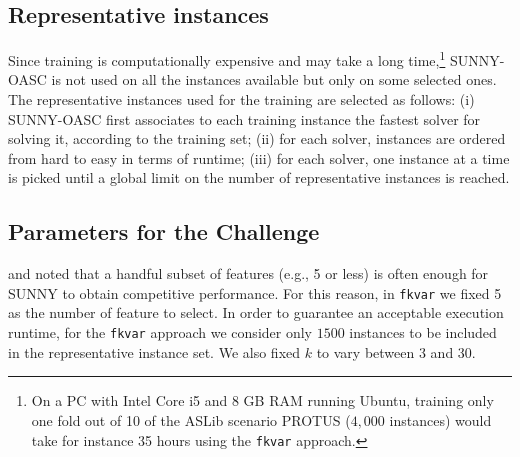 \documentclass[tablecaption=bottom,wcp]{jmlr} %
\newcommand{\TODO}[1]{\textcolor{red}{#1}}
\begin{document}
\subsection{Representative instances}
Since training is computationally expensive and may take a long time,\footnote{On a PC 
with Intel Core i5 and 8 GB RAM running Ubuntu, 
training only one fold out of 10 of the ASLib scenario PROTUS ($4,000$ 
instances) would take for instance 35 hours using the \texttt{fkvar} approach.} 
SUNNY-OASC is not used on all the instances available but only on some selected 
ones.
The representative instances used for the training are selected as follows: (i) 
SUNNY-OASC first associates to each training instance the fastest solver for solving 
it, according to the training set; (ii) for each solver, instances are 
ordered from hard to easy in terms of runtime;
(iii) for each solver, one instance at a time is picked until a 
global limit on the number of representative instances is reached.

\subsection{Parameters for the Challenge}
\cite{bischl2016aslib} and \cite{ictai_paper} noted that a handful 
subset 
of features (e.g., 5 or less) is often enough for SUNNY to obtain  
competitive performance. For this reason, in \texttt{fkvar} we fixed 
5 as the number of feature to select. In order to guarantee an acceptable 
execution runtime, for the \texttt{fkvar} approach we 
consider only $1500$ instances to be included in the 
representative instance set. We also fixed $k$ to vary between 3 and 30. 


\end{document}

